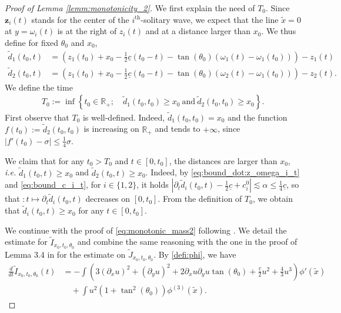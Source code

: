 \documentclass[reqno,10pt]{amsart}
\numberwithin{equation}{section}
\newcommand{\bz}{\mathbf{z}}
\begin{document}
	
	\begin{proof}[Proof of Lemma \ref{lemm:monotonicity_2}]
		We first explain the need of $T_0$. Since $\bz_i(t)$ stands for the center of the $i^{\text{th}}$-solitary wave, we expect that the line $\tilde{x}=0$ at $y=\omega_i(t)$ is at the right of $z_i(t)$ and at a distance larger than $x_0$. We thus define for fixed $\theta_0$ and $x_0$,
  \begin{align*}
      \tilde{d}_1(t_0,t) & = \left( z_1(t_0) + x_0 - \frac12 \underline{c} (t_0-t) - \tan(\theta_0) \left( \omega_1(t) - \omega_1(t_0) \right) \right) - z_1(t)  \\
      \tilde{d}_2(t_0,t) & = \left( z_1(t_0) + x_0 - \frac12 \underline{c} (t_0-t) - \tan(\theta_0) \left( \omega_2(t)- \omega_1(t_0) \right) \right)- z_2(t).
  \end{align*}
  We define the time
		\begin{align*}
			T_0:= \inf \left\{ t_0 \in \mathbb{R}_+ ; \quad \tilde{d}_1(t_0,t_0)\geq x_0 \ \text{and} \ \tilde{d}_2(t_0,t_0) \geq x_0 \right\}.
		\end{align*}
  First observe that $T_0$ is well-defined. Indeed, $\tilde{d}_1(t_0,t_0)=x_0$ and  the function $f(t_0) := \tilde{d}_2(t_0,t_0)$ is increasing on $\mathbb R_+$ and tends to $+\infty$, since $\left\vert f'(t_0)- \sigma \right\vert \leq \frac14 \sigma$.
  
  We claim that for any $t_0>T_0$ and $t \in [0,t_0]$, the distances are larger than $x_0$, \textit{i.e.} $\tilde{d}_1(t_0, t)\geq x_0$ and $\tilde{d}_2(t_0,t) \geq x_0$. Indeed, by \eqref{eq:bound_dot:z_omega_i_t} and \eqref{eq:bound_c_i_t}, for $i\in \{1,2 \}$, it holds $\left\vert \partial_t \tilde{d}_i(t_0,t) - \frac12 \underline{c} + c_i^0 \right\vert \lesssim \alpha \leq \frac14 \underline{c}$, so that  $:t \mapsto \partial_t\tilde{d}_i(t_0,t)$ decreases on $[0,t_0]$. From the definition of $T_0$, we obtain that $\tilde{d}_i(t_0,t)\geq x_0$ for any $t \in [0,t_0]$. 
  
		We continue with the proof of \eqref{eq:monotonic_mass2} following \cite{CMPS16}. We detail the estimate for $\tilde{I}_{x_0,t_0,\theta_0}$ and combine the same reasoning with the one in the proof of Lemma 3.4 in \cite{CMPS16} for the estimate on $\tilde{J}_{x_0,t_0,\theta_0}$. By \eqref{defi:phi}, we have
	\begin{align*}
		\frac{d}{dt} \tilde{I}_{x_0,t_0,\theta_0} (t) 
		& = - \int \left( 3 (\partial_x u) ^2 + ( \partial_y u)^2 +2 \partial_x u \partial_y u \tan(\theta_0) + \frac{\underline{c}}{2} u^2 +  \frac43 u^3  \right) \phi'(\tilde{x}) \\
		& \quad + \int u^2 \left( 1+ \tan^2(\theta_0) \right) \phi^{(3)}(\tilde{x}).
	\end{align*}
	

\end{proof}
\end{document}
